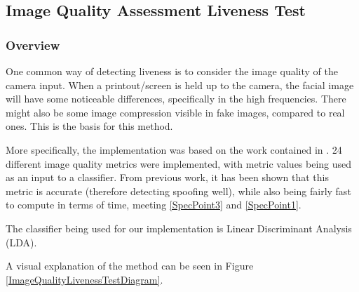 \documentclass[10pt,a4paper]{article}
\begin{document}
        \subsection{Image Quality Assessment Liveness Test}
            \subsubsection{Overview}
            One common way of detecting liveness is to consider the image quality of the camera input. When a printout/screen is held up to the camera, the facial image
            will have some noticeable differences, specifically in the high frequencies. There might also be some image compression visible in fake images, compared to real ones.
            This is the basis for this method.

            More specifically, the implementation was based on the work contained in \cite{ImageQualityAssessmentTest}. 24 different image quality metrics were implemented,
            with metric values being used as an input to a classifier. From previous work, it has been shown that this metric is accurate (therefore detecting spoofing well), while
            also being fairly fast to compute in terms of time, meeting \ref{SpecPoint3} and \ref{SpecPoint1}.

            The classifier being used for our implementation is Linear Discriminant Analysis (LDA).

            A visual explanation of the method can be seen in Figure \ref{ImageQualityLivenessTestDiagram}. 
\end{document}
